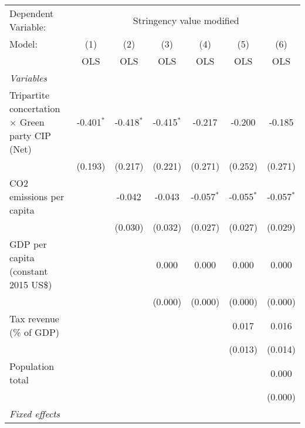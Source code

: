 
\begingroup
\centering
\begin{tabular}{lcccccc}
   \toprule
   Dependent Variable: & \multicolumn{6}{c}{Stringency value modified}\\
   Model:                                                  & (1)          & (2)          & (3)          & (4)          & (5)          & (6)\\  
                                                           &  OLS         & OLS          & OLS          & OLS          & OLS          & OLS\\  
   \midrule
   \emph{Variables}\\
   Tripartite concertation $\times$ Green party CIP (Net)  & -0.401$^{*}$ & -0.418$^{*}$ & -0.415$^{*}$ & -0.217       & -0.200       & -0.185\\   
                                                           & (0.193)      & (0.217)      & (0.221)      & (0.271)      & (0.252)      & (0.271)\\   
   CO2 emissions per capita                                &              & -0.042       & -0.043       & -0.057$^{*}$ & -0.055$^{*}$ & -0.057$^{*}$\\   
                                                           &              & (0.030)      & (0.032)      & (0.027)      & (0.027)      & (0.029)\\   
   GDP per capita (constant 2015 US\$)                     &              &              & 0.000        & 0.000        & 0.000        & 0.000\\   
                                                           &              &              & (0.000)      & (0.000)      & (0.000)      & (0.000)\\   
   Tax revenue (\% of GDP)                                 &              &              &              &              & 0.017        & 0.016\\   
                                                           &              &              &              &              & (0.013)      & (0.014)\\   
   Population total                                        &              &              &              &              &              & 0.000\\   
                                                           &              &              &              &              &              & (0.000)\\   
   \emph{Fixed effects}\\

\end{tabular}
